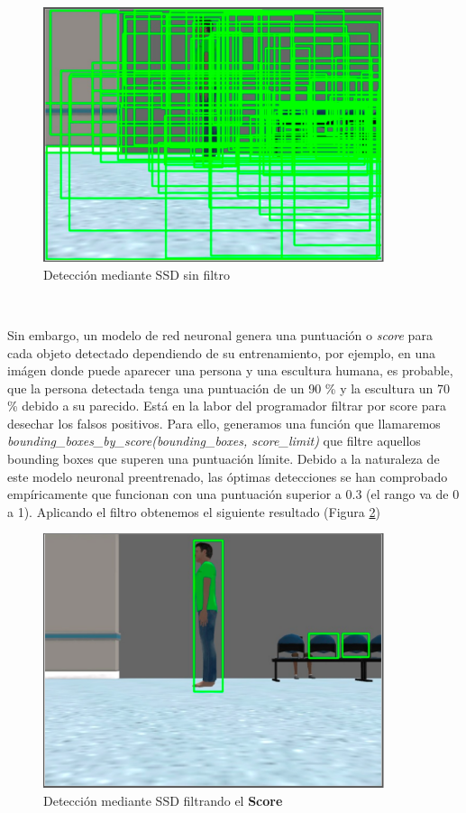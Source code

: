 \begin{figure} [H]
  \begin{center}
    \includegraphics[width=10cm]{imagenes/deteccion-ssd-sin-filtro.png}
  \end{center}
  \caption[Detección mediante SSD sin filtro]{Detección mediante SSD sin filtro}
  \label{fig:deteccion_ssd_sin_filtro}
\end{figure}\

Sin embargo, un modelo de red neuronal genera una puntuación o \textit{score} para cada objeto detectado dependiendo de su entrenamiento, por ejemplo, en una imágen donde puede aparecer una persona y una escultura humana, es probable, que la persona detectada tenga una puntuación de un 90 \% y la escultura un 70 \% debido a su parecido. Está en la labor del programador filtrar por score para desechar los falsos positivos. Para ello, generamos una función que llamaremos \textit{bounding\_boxes\_by\_score(bounding\_boxes, score\_limit)} que filtre aquellos bounding boxes que superen una puntuación límite. Debido a la naturaleza de este modelo neuronal preentrenado, las óptimas detecciones se han comprobado empíricamente que funcionan con una puntuación superior a 0.3 (el rango va de 0 a 1). Aplicando el filtro obtenemos el siguiente resultado (Figura \ref{fig:deteccion_ssd_filtro_score})\\

\begin{figure} [H]
  \begin{center}
    \includegraphics[width=10cm]{imagenes/deteccion-ssd-filtro-score.png}
  \end{center}
  \caption[Detección mediante SSD filtrando el \textbf{Score}]{Detección mediante SSD filtrando el \textbf{Score}}
  \label{fig:deteccion_ssd_filtro_score}
\end{figure}\


